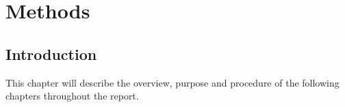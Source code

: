 \section{Methods}

\subsection{Introduction}
This chapter will describe the overview, purpose and procedure of the following chapters throughout the report.





